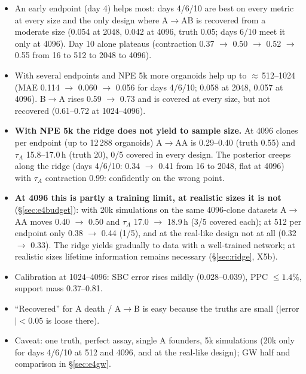 \documentclass[10pt,a4paper]{article}
\newcommand{\tA}{$\tau_A$}
\newcommand{\blk}[1]{\par\needspace{5\baselineskip}\smallskip{\sffamily\bfseries\color{inkgray}#1}\par}
\newcommand{\Comment}{\blk{Comment}}
\begin{document}
\Comment
\begin{itemize}
\item An early endpoint (day 4) helps most: days 4/6/10 are best on every metric at every size and the only design where A$\to$AB is recovered from a moderate size (0.054 at 2048, 0.042 at 4096, truth 0.05; days 6/10 meet it only at 4096). Day 10 alone plateaus (contraction 0.37 $\to$ 0.50 $\to$ 0.52 $\to$ 0.55 from 16 to 512 to 2048 to 4096).
\item With several endpoints and NPE 5k more organoids help up to $\approx$\,512--1024 (MAE 0.114 $\to$ 0.060 $\to$ 0.056 for days 4/6/10; 0.058 at 2048, 0.057 at 4096). B$\to$A rises 0.59 $\to$ 0.73 and is covered at every size, but not recovered (0.61--0.72 at 1024--4096).
\item \textbf{With NPE 5k the ridge does not yield to sample size.} At 4096 clones per endpoint (up to 12\,288 organoids) A$\to$AA is 0.29--0.40 (truth 0.55) and \tA{} 15.8--17.0\,h (truth 20), 0/5 covered in every design. The posterior creeps along the ridge (days 4/6/10: 0.34 $\to$ 0.41 from 16 to 2048, flat at 4096) with \tA{} contraction 0.99: confidently on the wrong point.
\item \textbf{At 4096 this is partly a training limit, at realistic sizes it is not} (\S\ref{sec:e4budget}): with 20k simulations on the same 4096-clone datasets A$\to$AA moves 0.40 $\to$ 0.50 and \tA{} 17.0 $\to$ 18.9\,h (3/5 covered each); at 512 per endpoint only 0.38 $\to$ 0.44 (1/5), and at the real-like design not at all (0.32 $\to$ 0.33). The ridge yields gradually to data with a well-trained network; at realistic sizes lifetime information remains necessary (\S\ref{sec:ridge}, X5b).
\item Calibration at 1024--4096: SBC error rises mildly (0.028--0.039), PPC $\le 1.4\%$, support mass 0.37--0.81.
\item ``Recovered'' for A death / A$\to$B is easy because the truths are small ($|$error$|<0.05$ is loose there).
\item Caveat: one truth, perfect assay, single A founders, 5k simulations (20k only for days 4/6/10 at 512 and 4096, and at the real-like design); GW half and comparison in \S\ref{sec:e4gw}.
\end{itemize}

\end{document}
